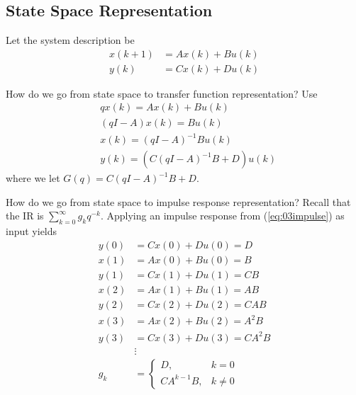 \documentclass[lecture,12pt,]{pcms-l}
\theoremstyle{example}
\begin{document}
\subsection{State Space Representation}
Let the system description be
\begin{align*}
x(k+1) &= Ax(k) + Bu(k) \\
y(k) &= Cx(k) + Du(k)
\end{align*}

How do we go from state space to transfer function representation? Use
\begin{align*}
&qx(k) = Ax(k) + Bu(k) \\
&(qI-A)x(k) = Bu(k) \\
&x(k) = (qI-A)^{-1}Bu(k) \\
&y(k) = (C(qI-A)^{-1}B+D)u(k)
\end{align*}
where we let $G(q) = C(qI-A)^{-1}B+D$.

How do we go from state space to impulse response representation? Recall that the IR is $\sum_{k=0}^\infty g_kq^{-k}$. Applying an impulse response from (\ref{eq:03impulse}) as input yields
\begin{align*}
y(0) &= Cx(0) + Du(0) = D \\
x(1) &= Ax(0) + Bu(0) = B \\
y(1) &= Cx(1) + Du(1) = CB \\
x(2) &= Ax(1) + Bu(1) = AB \\
y(2) &= Cx(2) + Du(2) = CAB \\
x(3) &= Ax(2) + Bu(2) = A^2B \\
y(3) &= Cx(3) + Du(3) = CA^2B \\
&\vdots \\
g_k &= \begin{cases} D, & k=0 \\ CA^{k-1}B, & k\neq 0 \end{cases}
\end{align*}
\end{document}
